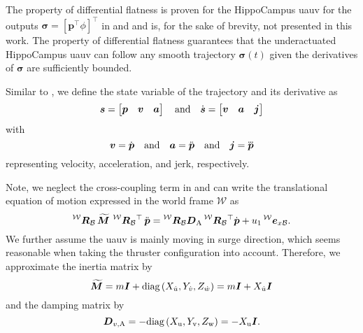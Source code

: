 The property of differential flatness is proven for the HippoCampus \ac{uauv} for the outputs $\bm{\sigma} = \left[\bm{p}^\top \phi\right]^\top$ in \cite{duecker2021aerobatics} and \cite{duecker-phd} and is, for the sake of brevity, not presented in this work. The property of differential flatness guarantees that the underactuated HippoCampus \ac{uauv} can follow any smooth trajectory $\bm{\sigma}(t)$ given the derivatives of $\bm{\sigma}$ are sufficiently bounded.

Similar to \cite{MuellerHehn15}, we define the state variable of the trajectory and its derivative as
\begin{equation}
	\label{eq:trajectory-state}
	\mbox{$\bm{s}$} = 
	\begin{bmatrix}
		\mbox{$\bm{p}$} & \mbox{$\bm{v}$} & \mbox{$\bm{a}$}	
	\end{bmatrix}
	\quad
	\text{and}
	\quad
	\mbox{$\dot{\bm{s}}$} =
	\begin{bmatrix}
		\mbox{$\bm{v}$} &
		\mbox{$\bm{a}$} &
		\mbox{$\bm{j}$}
	\end{bmatrix}
\end{equation}
with
\begin{equation}
	\mbox{$\bm{v}$} = \mbox{$\dot{\bm{p}}$}
	\quad
	\text{and}
	\quad
	\mbox{$\bm{a}$} = \mbox{$\ddot{\bm{p}}$}
	\quad
	\text{and}
	\quad
	\mbox{$\bm{j}$} = \mbox{$\dddot{\bm{p}}$}
\end{equation}
representing velocity, acceleration, and jerk, respectively.

Note, we neglect the cross-coupling term in  and can write the translational equation of motion expressed in the world frame $\mathcal{W}$ as
\begin{equation}
	\label{eq:eom-world-without-cross-coupling}
	\Rbodyworld \, \Mbs \, \Rbodyworld^\top \, \pbpp = \Rbodyworld\Dadded\Rbodyworld^\top \pbp + u_1 \exbodyinworld.
\end{equation}
We further assume the \ac{uauv} is mainly moving in surge direction, which seems reasonable when taking the thruster configuration into account. Therefore, we approximate the inertia matrix by
\begin{equation}
	\label{eq:added-mass-trajectory-simplification}
	\mbox{$\widetilde{\bm{M}}$} = m\mbox{$\bm{I}$} + \text{diag}\left(X_{\dot{u}}, Y_{\dot{v}}, Z_{\dot{w}}\right)
	=
	m\mbox{$\bm{I}$} + X_{\dot{u}} \mbox{$\bm{I}$}
\end{equation} %
and the damping matrix by
\begin{equation}
	\label{eq:added-damping-trajectory-simplification}
	\mbox{$\bm{D}$}_{v,\text{A}} = -\text{diag}\left(X_\text{u}, Y_\text{v}, Z_\text{w}\right)
	= -X_\text{u} \mbox{$\bm{I}$}
	.
\end{equation} %


